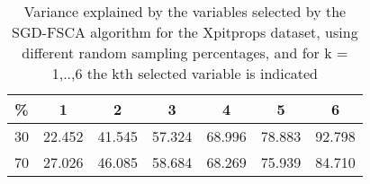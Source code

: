 \begin{table}
	\begin{center}
		\begin{tabular}{c c c c c c c}
			\% & 1 & 2 & 3 & 4 & 5 & 6 \\
			\hline
			30 & 22.452 & 41.545 & 57.324 & 68.996 & 78.883 & 92.798 \\
			70 & 27.026 & 46.085 & 58.684 & 68.269 & 75.939 & 84.710 \\
		\end{tabular}
	\end{center}
	\caption{Variance explained by the variables selected by the SGD-FSCA algorithm for the Xpitprops dataset, using different random sampling percentages, and for k = 1,..,6 the kth selected variable is indicated}
\end{table}